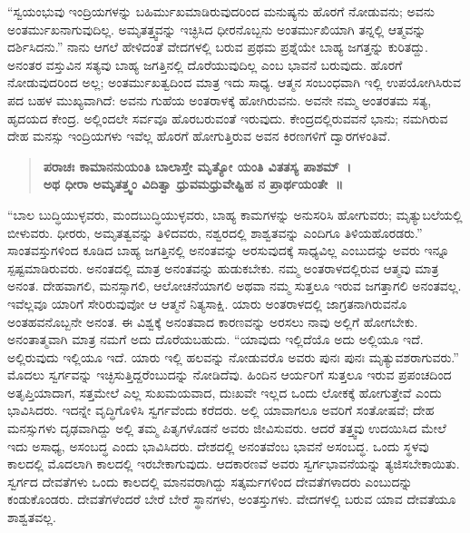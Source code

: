 “ಸ್ವಯಂಭುವು ಇಂದ್ರಿಯಗಳನ್ನು ಬಹಿರ್ಮುಖಮಾಡಿರುವುದರಿಂದ ಮನುಷ್ಯನು ಹೊರಗೆ ನೋಡುವನು; ಅವನು ಅಂತರ್ಮುಖನಾಗುವುದಿಲ್ಲ. ಅಮೃತತ್ತ್ವವನ್ನು ಇಚ್ಛಿಸಿದ ಧೀರನೊಬ್ಬನು ಅಂತರ್ಮುಖಿಯಾಗಿ ತನ್ನಲ್ಲಿ ಆತ್ಮವನ್ನು ದರ್ಶಿಸಿದನು.” ನಾನು ಆಗಲೆ ಹೇಳಿದಂತೆ ವೇದಗಳಲ್ಲಿ ಬರುವ ಪ್ರಥಮ ಪ್ರಶ್ನೆಯೇ ಬಾಹ್ಯ ಜಗತ್ತನ್ನು ಕುರಿತದ್ದು. ಅನಂತರ ವಸ್ತುವಿನ ಸತ್ಯವು ಬಾಹ್ಯ ಜಗತ್ತಿನಲ್ಲಿ ದೊರೆಯುವುದಿಲ್ಲ ಎಂಬ ಭಾವನೆ ಬರುವುದು. ಹೊರಗೆ ನೋಡುವುದರಿಂದ ಅಲ್ಲ; ಅಂತರ್ಮುಖತ್ವದಿಂದ ಮಾತ್ರ ಇದು ಸಾಧ್ಯ. ಆತ್ಮನ ಸಂಬಂಧವಾಗಿ ಇಲ್ಲಿ ಉಪಯೋಗಿಸಿರುವ ಪದ ಬಹಳ ಮುಖ್ಯವಾಗಿದೆ: ಅವನು ಗುಹೆಯ ಅಂತರಾಳಕ್ಕೆ ಹೋಗಿರುವನು. ಅವನೇ ನಮ್ಮ ಅಂತರತಮ ಸತ್ಯ, ಹೃದಯದ ಕೇಂದ್ರ. ಅಲ್ಲಿಂದಲೇ ಸರ್ವವೂ ಹೊರಬರುವಂತೆ ಇರುವುದು. ಕೇಂದ್ರದಲ್ಲಿರುವವನೆ ಭಾನು; ನಮಗಿರುವ ದೇಹ ಮನಸ್ಸು ಇಂದ್ರಿಯಗಳು ಇವೆಲ್ಲ ಹೊರಗೆ ಹೋಗುತ್ತಿರುವ ಅವನ ಕಿರಣಗಳಿಗೆ ದ್ವಾರಗಳಂತಿವೆ.

\begin{verse}
\textbf{ಪರಾಚಃ ಕಾಮಾನನುಯಂತಿ ಬಾಲಾಸ್ತೇ ಮೃತ್ಯೋ ಯಂತಿ ವಿತತಸ್ಯ ಪಾಶಮ್​~।\\ಅಥ ಧೀರಾ ಅಮೃತತ್ತ್ವಂ ವಿದಿತ್ವಾ ಧ್ರುವಮಧ್ರುವೇಷ್ಟಿಹ ನ ಪ್ರಾರ್ಥಯಂತೇ~॥}
\end{verse}

“ಬಾಲ ಬುದ್ಧಿಯುಳ್ಳವರು, ಮಂದಬುದ್ಧಿಯುಳ್ಳವರು, ಬಾಹ್ಯ ಕಾಮಗಳನ್ನು ಅನುಸರಿಸಿ ಹೋಗುವರು; ಮೃತ್ಯುಬಲೆಯಲ್ಲಿ ಬೀಳುವರು. ಧೀರರು, ಅಮೃತತ್ವವನ್ನು ತಿಳಿದವರು, ನಶ್ವರದಲ್ಲಿ ಶಾಶ್ವತವನ್ನು ಎಂದಿಗೂ ತಿಳಿಯಹೊರಡರು.” ಸಾಂತವಸ್ತುಗಳಿಂದ ಕೂಡಿದ ಬಾಹ್ಯ ಜಗತ್ತಿನಲ್ಲಿ ಅನಂತವನ್ನು ಅರಸುವುದಕ್ಕೆ ಸಾಧ್ಯವಿಲ್ಲ ಎಂಬುದನ್ನು ಅವರು ಇನ್ನೂ ಸ್ಪಷ್ಟಮಾಡಿರುವರು. ಅನಂತದಲ್ಲಿ ಮಾತ್ರ ಅನಂತವನ್ನು ಹುಡುಕಬೇಕು. ನಮ್ಮ ಅಂತರಾಳದಲ್ಲಿರುವ ಆತ್ಮವು ಮಾತ್ರ ಅನಂತ. ದೇಹವಾಗಲಿ, ಮನಸ್ಸಾಗಲಿ, ಆಲೋಚನೆಯಾಗಲಿ ಅಥವಾ ನಮ್ಮ ಸುತ್ತಲೂ ಇರುವ ಜಗತ್ತಾಗಲಿ ಅನಂತವಲ್ಲ. ಇವೆಲ್ಲವೂ ಯಾರಿಗೆ ಸೇರಿರುವುವೋ ಆ ಆತ್ಮನೆ ನಿತ್ಯಸಾಕ್ಷಿ. ಯಾರು ಅಂತರಾಳದಲ್ಲಿ ಜಾಗ್ರತನಾಗಿರುವನೊ ಅಂತಹವನೊಬ್ಬನೇ ಅನಂತ. ಈ ವಿಶ್ವಕ್ಕೆ ಅನಂತವಾದ ಕಾರಣವನ್ನು ಅರಸಲು ನಾವು ಅಲ್ಲಿಗೆ ಹೋಗಬೇಕು. ಅನಂತಾತ್ಮವಾಗಿ ಮಾತ್ರ ನಮಗೆ ಅದು ದೊರೆಯಬಹುದು. “ಯಾವುದು ಇಲ್ಲಿದೆಯೊ ಅದು ಅಲ್ಲಿಯೂ ಇದೆ. ಅಲ್ಲಿರುವುದು ಇಲ್ಲಿಯೂ ಇದೆ. ಯಾರು ಇಲ್ಲಿ ಹಲವನ್ನು ನೋಡುವರೊ ಅವರು ಪುನಃ ಪುನಃ ಮೃತ್ಯುವಶರಾಗುವರು.” ಮೊದಲು ಸ್ವರ್ಗವನ್ನು ಇಚ್ಛಿಸುತ್ತಿದ್ದರೆಂಬುದನ್ನು ನೋಡಿದೆವು. ಹಿಂದಿನ ಆರ್ಯರಿಗೆ ಸುತ್ತಲೂ ಇರುವ ಪ್ರಪಂಚದಿಂದ ಅತೃಪ್ತಿಯಾದಾಗ, ಸತ್ತಮೇಲೆ ಎಲ್ಲ ಸುಖಮಯವಾದ, ದುಃಖವೇ ಇಲ್ಲದ ಒಂದು ಲೋಕಕ್ಕೆ ಹೋಗುತ್ತೇವೆ ಎಂದು ಭಾವಿಸಿದರು. ಇದನ್ನೇ ವೃದ್ಧಿಗೊಳಿಸಿ ಸ್ವರ್ಗವೆಂದು ಕರೆದರು. ಅಲ್ಲಿ ಯಾವಾಗಲೂ ಅವರಿಗೆ ಸಂತೋಷವೆ; ದೇಹ ಮನಸ್ಸುಗಳು ದೃಢವಾಗಿದ್ದು ಅಲ್ಲಿ ತಮ್ಮ ಪಿತೃಗಳೊಡನೆ ಅವರು ಜೀವಿಸುವರು. ಆದರೆ ತತ್ತ್ವವು ಉದಯಿಸಿದ ಮೇಲೆ ಇದು ಅಸಾಧ್ಯ, ಅಸಂಬದ್ಧ ಎಂದು ಭಾವಿಸಿದರು. ದೇಶದಲ್ಲಿ ಅನಂತವೆಂಬ ಭಾವನೆ ಅಸಂಬದ್ಧ. ಒಂದು ಸ್ಥಳವು ಕಾಲದಲ್ಲಿ ಮೊದಲಾಗಿ ಕಾಲದಲ್ಲಿ ಇರಬೇಕಾಗುವುದು. ಆದಕಾರಣವೆ ಅವರು ಸ್ವರ್ಗಭಾವನೆಯನ್ನು ತ್ಯಜಿಸಬೇಕಾಯಿತು. ಸ್ವರ್ಗದ ದೇವತೆಗಳು ಒಂದು ಕಾಲದಲ್ಲಿ ಮಾನವರಾಗಿದ್ದು ಸತ್ಕರ್ಮಗಳಿಂದ ದೇವತೆಗಳಾದರು ಎಂಬುದನ್ನು ಕಂಡುಕೊಂಡರು. ದೇವತೆಗಳೆಂದರೆ ಬೇರೆ ಬೇರೆ ಸ್ಥಾನಗಳು, ಅಂತಸ್ತುಗಳು. ವೇದಗಳಲ್ಲಿ ಬರುವ ಯಾವ ದೇವತೆಯೂ ಶಾಶ್ವತವಲ್ಲ.

\vskip 0.2cm 

